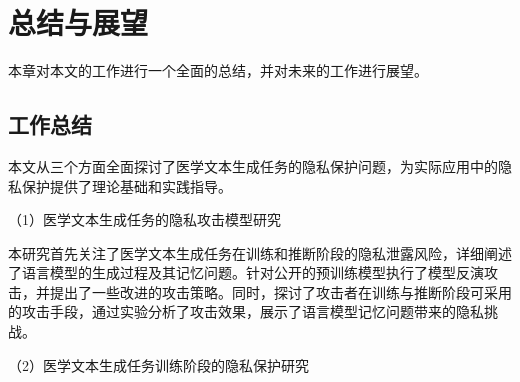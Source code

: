 
\chapter{总结与展望}

本章对本文的工作进行一个全面的总结，并对未来的工作进行展望。
\section{工作总结}
本文从三个方面全面探讨了医学文本生成任务的隐私保护问题，为实际应用中的隐私保护提供了理论基础和实践指导。

（1）医学文本生成任务的隐私攻击模型研究


本研究首先关注了医学文本生成任务在训练和推断阶段的隐私泄露风险，详细阐述了语言模型的生成过程及其记忆问题。针对公开的预训练模型执行了模型反演攻击，并提出了一些改进的攻击策略。同时，探讨了攻击者在训练与推断阶段可采用的攻击手段，通过实验分析了攻击效果，展示了语言模型记忆问题带来的隐私挑战。

（2）医学文本生成任务训练阶段的隐私保护研究


